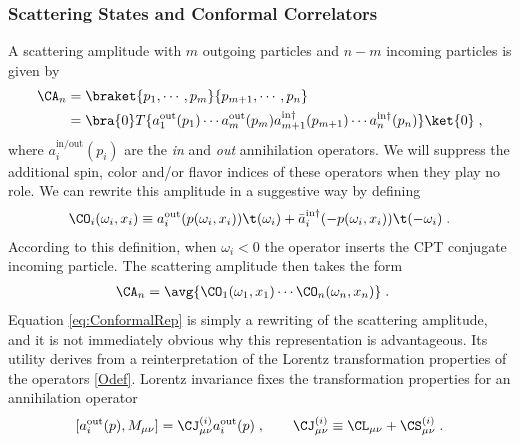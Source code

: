 \documentclass[11pt]{article}
\def\o{{\omega}}
\begin{document}
\subsubsection*{Scattering States and Conformal Correlators}
\label{sec:in-out-op}

A scattering amplitude with $m$ outgoing particles and $n-m$ incoming particles is given by
\begin{equation}
\begin{split}\label{scat-amp}
\CA_n &=  \braket{ p_1 , \cdots , p_m }{ p_{m+1} , \cdots , p_n } \\
&= \bra{0} T \{ a_1^\text{out}(p_1) \cdots a_m^\text{out}(p_m) a_{m+1}^{\text{in}\dagger} (p_{m+1} ) \cdots a_{n}^{\text{in}\dagger} (p_n ) \} \ket{0} \; , 
\end{split}
\end{equation}
where $a_i^{\text{in}/\text{out}}(p_i)$ are the \emph{in} and \emph{out} annihilation operators. We will suppress the additional spin, color and/or flavor indices of these operators when they play no role. We can rewrite this amplitude in a suggestive way by defining
\begin{equation}
\begin{split}\label{Odef}
\CO_i(\o_i,x_i) \equiv a_i^\text{out}(p(\o_i,x_i)) \t(\o_i) + {\bar a}_i^{\text{in}\dagger}(-p(\o_i,x_i)) \t(-\o_i) \;. 
\end{split}
\end{equation}
According to this definition, when $\o_i < 0$ the operator inserts the CPT conjugate incoming particle. The scattering amplitude then takes the form 
\begin{equation}\label{eq:ConformalRep}
\begin{split}
\CA_n &=  \avg{ \CO_1(\o_1,x_1) \cdots \CO_n(\o_n,x_n) } \; . 
\end{split}
\end{equation}
Equation \eqref{eq:ConformalRep} is simply a rewriting of the scattering amplitude, and it is not immediately obvious why this representation is advantageous. Its utility derives from a reinterpretation of the Lorentz transformation properties of the operators \eqref{Odef}. Lorentz invariance fixes the transformation properties for an annihilation operator 
\begin{equation}
\begin{split}\label{LTa}
[ a_i^\text{out}(p) , M_{\mu\nu} ] = \CJ^{(i)}_{\mu\nu}   a_i^\text{out}(p) \; ,  \qquad   \CJ^{(i)}_{\mu\nu}  \equiv  \CL_{\mu\nu} + \CS^{(i)}_{\mu\nu} \;  .
\end{split}
\end{equation}
\end{document}
